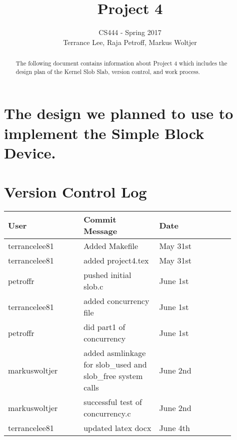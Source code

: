 \documentclass[draftclsnofoot,onecolumn,10pt,compsoc]{IEEEtran}
\begin{document}
\begin{titlepage}
	\title{Project 4}
	\author{CS444 - Spring 2017 \\ Terrance Lee, Raja Petroff, Markus Woltjer}
	\maketitle
	\begin{abstract}
		The following document contains information about Project 4 which includes the design plan of the Kernel Slob Slab, version control, and work process.  
	\end{abstract}
	
	\thispagestyle{empty} %
	
\end{titlepage}

\tableofcontents

\newpage

\section{The design we planned to use to implement the Simple Block Device.}
\section{Version Control Log}
\begin{center}
	\begin{tabular}{| p{0.3\linewidth} | p{0.3\linewidth} | p{0.3\linewidth} |}
		\hline User & Commit Message & Date\\
		\hline terrancelee81 & Added Makefile & May 31st\\
		\hline terrancelee81 & added project4.tex& May 31st\\
		\hline petroffr & pushed initial slob.c & June 1st \\ 	
		\hline terrancelee81 & added concurrency file & June 1st\\
		\hline petroffr & did part1 of concurrency & June 1st\\
		\hline markuswoltjer & added asmlinkage for slob\_used and slob\_free system calls & June 2nd\\
		\hline markuswoltjer & successful test of concurrency.c & June 2nd\\
		\hline terrancelee81 & updated latex docx & June 4th\\
	\end{tabular}
\end{center}
\end{document}
